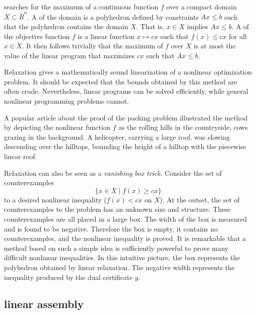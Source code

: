 searches for the maximum of a
continuous function $f$ over a compact domain $X\subset \ring{R}^n$.
A  of the domain is a polyhedron defined by
constraints $A x \le b$ such that the polyhedron contains the domain
$X$.  That is, $x\in X$ implies $A x \le b$.  A  of the objective function $f$ is a linear function
$x\mapsto c x$ such that $f(x) \le c x$ for all $x\in X$.  It then
follows trivially that the maximum of $f$ over $X$ is at most the
value of the linear program that maximizes $c x$ such that $A x \le
b$.

Relaxation gives a mathematically sound linearization of a
nonlinear optimization problem.  It should be expected that the bounds
obtained by this method are often  crude.  Nevertheless, linear
programs can be solved efficiently, while general nonlinear
programming problems cannot.

\begin{remark}[popularization]
A popular article about the proof of the packing problem
illustrated the method by depicting the nonlinear function $f$
as the rolling hills in the countryside, cows grazing in the background.  
A helicopter,
carrying a large roof, was slowing
descending over the hilltops, bounding the height of a hilltop
with the piecewise linear roof.
\end{remark}

\begin{remark}
Relaxation can also be seen as a {\it vanishing
box trick.}  Consider the set of counterexamples
\[
\{x\in X\mid f(x)\ge c x\}
\]
to a desired nonlinear inequality ($f(x)< c x$ on $X$).  At the
outset, the set of counterexamples to the problem has an unknown size
and structure.  These counterexamples are all placed in a large box.
The width of the box is measured and is found to be negative.
Therefore the box is empty, it contains no counterexamples, and the
nonlinear inequality is proved.  It is remarkable that a method based
on such a simple idea is sufficiently powerful to prove many difficult
nonlinear inequalities.  In this intuitive picture, the box represents
the polyhedron obtained by linear relaxation.  The negative width
represents the inequality produced by the dual certificate $y$.
\end{remark}

\subsection{linear assembly}

